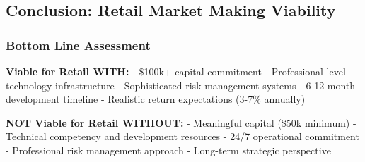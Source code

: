 \begin{Shaded}
\begin{Highlighting}[]
\OperatorTok{=}\NormalTok{ \{}
        \NormalTok{: }\NormalTok{,}
        \NormalTok{: }\NormalTok{,}
        \NormalTok{: }\NormalTok{,  }
        \NormalTok{: }\NormalTok{,}
        \NormalTok{: }
\NormalTok{    \}}
    
\OperatorTok{=}\NormalTok{ monthly\_costs[}\NormalTok{] }\OperatorTok{/}   
\end{Highlighting}
\end{Shaded}

\hypertarget{conclusion-retail-market-making-viability}{%
\subsection{Conclusion: Retail Market Making
Viability}\label{conclusion-retail-market-making-viability}}

\hypertarget{bottom-line-assessment}{%
\subsubsection{\texorpdfstring{\textbf{Bottom Line
Assessment}}{Bottom Line Assessment}}\label{bottom-line-assessment}}

\textbf{Viable for Retail WITH:} - \$100k+ capital commitment -
Professional-level technology infrastructure - Sophisticated risk
management systems - 6-12 month development timeline - Realistic return
expectations (3-7\% annually)

\textbf{NOT Viable for Retail WITHOUT:} - Meaningful capital (\$50k
minimum) - Technical competency and development resources - 24/7
operational commitment - Professional risk management approach -
Long-term strategic perspective

